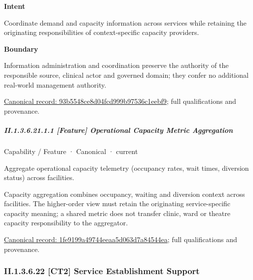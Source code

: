 \textbf{Intent}



Coordinate demand and capacity information across services while retaining the originating responsibilities of context-specific capacity providers.



\textbf{Boundary}



Information administration and coordination preserve the authority of the responsible source, clinical actor and governed domain; they confer no additional real-world management authority.


{\footnotesize \href{../../../../../../../continuum/strategy/capability/93b5548ce8d04fcd999b97536c1eebf9.md}{Canonical record: 93b5548ce8d04fcd999b97536c1eebf9}; full qualifications and provenance.}\par
\subparagraph*{II.1.3.6.21.1.1 [Feature] Operational Capacity Metric Aggregation}
\label{navigation:II.1.3.6.21.1.1}

\label{element:1fe9199a49744eeaa5d063d7a84544ea}
{\small Capability / Feature · Canonical · current}\par

Aggregate operational capacity telemetry (occupancy rates, wait times, diversion status) across facilities.



Capacity aggregation combines occupancy, waiting and diversion context across facilities. The higher-order view must retain the originating service-specific capacity meaning; a shared metric does not transfer clinic, ward or theatre capacity responsibility to the aggregator.


{\footnotesize \href{../../../../../../../continuum/strategy/capability/feature/1fe9199a49744eeaa5d063d7a84544ea.md}{Canonical record: 1fe9199a49744eeaa5d063d7a84544ea}; full qualifications and provenance.}\par
\subsubsection*{II.1.3.6.22 [CT2] Service Establishment Support}
\label{navigation:II.1.3.6.22}

